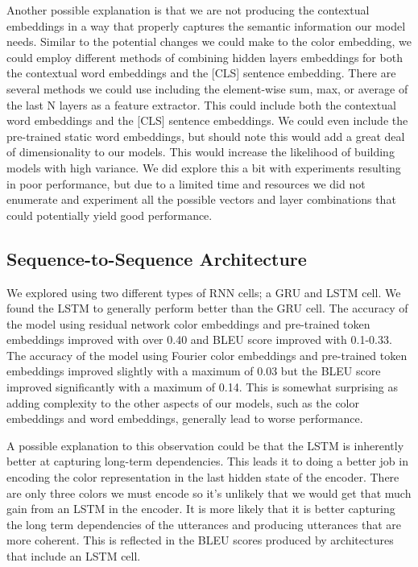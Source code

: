 \par
Another possible explanation is that we are not producing the contextual embeddings in a way that properly captures the semantic information our model needs. Similar to the potential changes we could make to the color embedding, we could employ different methods of combining hidden layers embeddings for both the contextual word embeddings and the [CLS] sentence embedding. There are several methods we could use including the element-wise sum, max, or average of the last N layers as a feature extractor. This could include both the contextual word embeddings and the [CLS] sentence embeddings. We could even include the pre-trained static word embeddings, but should note this would add a great deal of dimensionality to our models. This would increase the likelihood of building models with high variance. We did explore this a bit with experiments resulting in poor performance, but due to a limited time and resources we did not enumerate and experiment all the possible vectors and layer combinations that could potentially yield good performance.


\subsection{Sequence-to-Sequence Architecture}

We explored using two different types of RNN cells; a GRU and LSTM cell. We found the LSTM to generally perform better than the GRU cell. The accuracy of the model using residual network color embeddings and pre-trained token embeddings improved with over 0.40 and BLEU score improved with 0.1-0.33. The accuracy of the model using Fourier color embeddings and pre-trained token embeddings improved slightly with a maximum of 0.03 but the BLEU score improved significantly with a maximum of 0.14. This is somewhat surprising as adding complexity to the other aspects of our models, such as the color embeddings and word embeddings, generally lead to worse performance.

\par
A possible explanation to this observation could be that the LSTM is inherently better at capturing long-term dependencies. This leads it to doing a better job in encoding the color representation in the last hidden state of the encoder. There are only three colors we must encode so it’s unlikely that we would get that much gain from an LSTM in the encoder. It is more likely that it is better capturing the long term dependencies of the utterances and producing utterances that are more coherent. This is reflected in the BLEU scores produced by architectures that include an LSTM cell.


